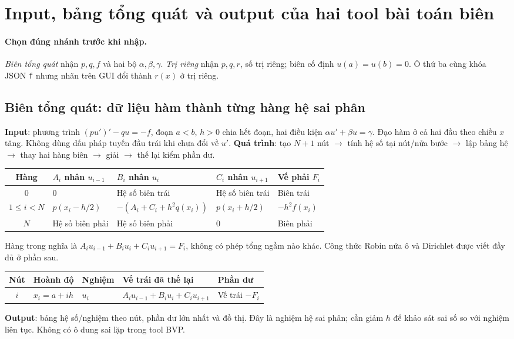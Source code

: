 \section{Input, bảng tổng quát và output của hai tool bài toán biên}

\paragraph{Chọn đúng nhánh trước khi nhập.} \emph{Biên tổng quát} nhận $p,q,f$ và hai bộ $\alpha,\beta,\gamma$. \emph{Trị riêng} nhận $p,q,r$, số trị riêng; biên cố định $u(a)=u(b)=0$. Ô thứ ba cùng khóa JSON \texttt{f} nhưng nhãn trên GUI đổi thành $r(x)$ ở trị riêng.

\subsection{Biên tổng quát: dữ liệu hàm thành từng hàng hệ sai phân}
\textbf{Input}: phương trình $(pu')'-qu=-f$, đoạn $a<b$, $h>0$ chia hết đoạn, hai điều kiện $\alpha u'+\beta u=\gamma$. Đạo hàm ở cả hai đầu theo chiều $x$ tăng. Không dùng dấu pháp tuyến đầu trái khi chưa đổi về $u'$.
\textbf{Quá trình}: tạo $N+1$ nút $\to$ tính hệ số tại nút/nửa bước $\to$ lập bảng hệ $\to$ thay hai hàng biên $\to$ giải $\to$ thế lại kiểm phần dư.
\begin{center}\small\begin{tabular}{cllll}\toprule
Hàng&$A_i$ nhân $u_{i-1}$&$B_i$ nhân $u_i$&$C_i$ nhân $u_{i+1}$&Vế phải $F_i$\\\midrule
0&0&Hệ số biên trái&Hệ số biên trái&Biên trái\\
$1\le i<N$&$p(x_i-h/2)$&$-(A_i+C_i+h^2q(x_i))$&$p(x_i+h/2)$&$-h^2f(x_i)$\\
$N$&Hệ số biên phải&Hệ số biên phải&0&Biên phải\\\bottomrule
\end{tabular}\end{center}
Hàng trong nghĩa là $A_iu_{i-1}+B_iu_i+C_iu_{i+1}=F_i$, không có phép tổng ngầm nào khác. Công thức Robin nửa ô và Dirichlet được viết đầy đủ ở phần sau.
\begin{center}\small\begin{tabular}{cllll}\toprule
Nút&Hoành độ&Nghiệm&Vế trái đã thế lại&Phần dư\\\midrule
$i$&$x_i=a+ih$&$u_i$&$A_iu_{i-1}+B_iu_i+C_iu_{i+1}$&Vế trái $-F_i$\\\bottomrule
\end{tabular}\end{center}
\textbf{Output}: bảng hệ số/nghiệm theo nút, phần dư lớn nhất và đồ thị. Đây là nghiệm hệ sai phân; cần giảm $h$ để khảo sát sai số so với nghiệm liên tục. Không có ô dung sai lặp trong tool BVP.

